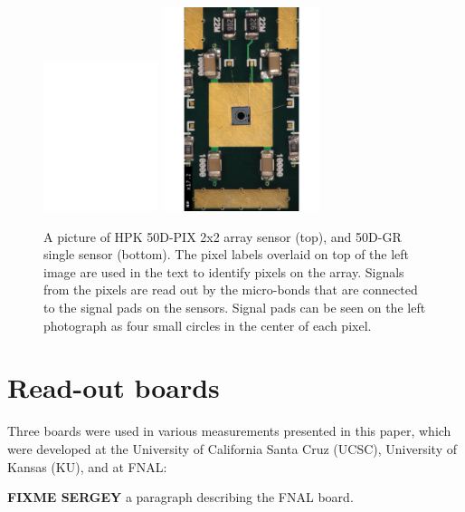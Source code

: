 \documentclass[preprint,1p]{elsarticle}
\begin{document}
\begin{figure}[!htbp] 
\centering
\includegraphics[width=0.3\textwidth]{figs/HPK-50DPix.pdf} 
\includegraphics[width=0.41\textwidth]{figs/HPK-50D.pdf} 
\caption{A picture of HPK 50D-PIX 2x2 array sensor (top), and 50D-GR single sensor (bottom). The pixel labels overlaid on top of the left image are used in the text to identify pixels on the array. Signals from the pixels are read out by the micro-bonds that are connected to the signal pads on the sensors. Signal pads can be seen on the left photograph as four small circles in the center of each pixel. } 
\label{fig:HPK_Sensors} 
\end{figure} 





\section{Read-out boards}
\label{sec:boards}

Three boards were used in various measurements presented in this paper, which
were developed at the University of California Santa Cruz (UCSC), University of
Kansas (KU), and at FNAL:

\textbf {FIXME SERGEY} a paragraph describing the FNAL board. 
\end{document}
